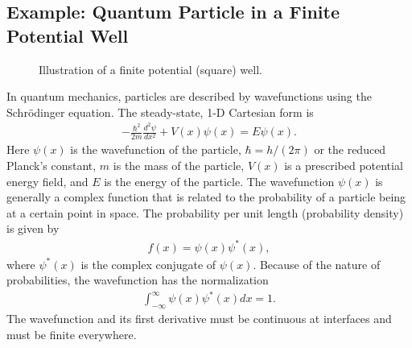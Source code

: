 \subsection{Example: Quantum Particle in a Finite Potential Well}

\begin{figure}[tb!]
\begin{center}
\caption{Illustration of a finite potential (square) well.}
\label{Fig:ode_finitePotentialWell}
\end{center}
\end{figure}

In quantum mechanics, particles are described by wavefunctions using the Schr{\"o}dinger equation. The steady-state, 1-D Cartesian form is
\begin{align}
  -\frac{\hbar^2}{2m} \frac{d^2\psi}{dx^2} + V(x) \psi(x) = E \psi(x).
\end{align}
Here $\psi(x)$ is the wavefunction of the particle, $\hbar = h/(2\pi)$ or the reduced Planck's constant, $m$ is the mass of the particle, $V(x)$ is a prescribed potential energy field, and $E$ is the energy of the particle. The wavefunction $\psi(x)$ is generally a complex function that is related to the probability of a particle being at a certain point in space. The probability per unit length (probability density) is given by
\begin{align} 
  f(x) = \psi(x) \psi^*(x),
\end{align}
where $\psi^*(x)$ is the complex conjugate of $\psi(x)$. Because of the nature of probabilities, the wavefunction has the normalization
\begin{align}
  \int_{-\infty}^\infty \psi(x) \psi^*(x) dx = 1.
\end{align}
The wavefunction and its first derivative must be continuous at interfaces and must be finite everywhere.

